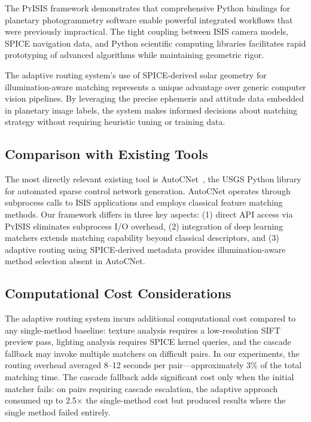 \documentclass[lettersize,journal]{IEEEtran}
\newcommand{\pyisis}{\textsc{PyISIS}}
\begin{document}
The \pyisis{} framework demonstrates that comprehensive Python bindings for planetary photogrammetry software enable powerful integrated workflows that were previously impractical. The tight coupling between ISIS camera models, SPICE navigation data, and Python scientific computing libraries facilitates rapid prototyping of advanced algorithms while maintaining geometric rigor.

The adaptive routing system's use of SPICE-derived solar geometry for illumination-aware matching represents a unique advantage over generic computer vision pipelines. By leveraging the precise ephemeris and attitude data embedded in planetary image labels, the system makes informed decisions about matching strategy without requiring heuristic tuning or training data.

\subsection{Comparison with Existing Tools}

The most directly relevant existing tool is AutoCNet~\cite{laura2018autocnet}, the USGS Python library for automated sparse control network generation. AutoCNet operates through subprocess calls to ISIS applications and employs classical feature matching methods. Our framework differs in three key aspects: (1) direct API access via \pyisis{} eliminates subprocess I/O overhead, (2) integration of deep learning matchers extends matching capability beyond classical descriptors, and (3) adaptive routing using SPICE-derived metadata provides illumination-aware method selection absent in AutoCNet.

\subsection{Computational Cost Considerations}

The adaptive routing system incurs additional computational cost compared to any single-method baseline: texture analysis requires a low-resolution SIFT preview pass, lighting analysis requires SPICE kernel queries, and the cascade fallback may invoke multiple matchers on difficult pairs. In our experiments, the routing overhead averaged 8--12 seconds per pair---approximately 3\% of the total matching time. The cascade fallback adds significant cost only when the initial matcher fails: on pairs requiring cascade escalation, the adaptive approach consumed up to 2.5$\times$ the single-method cost but produced results where the single method failed entirely.
\end{document}
